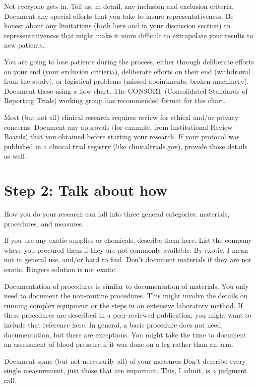 \documentclass[
  letterpaper,
  DIV=11,
  numbers=noendperiod]{scrreprt}
\begin{document}
Not everyone gets in. Tell us, in detail, any inclusion and exclusion
criteria. Document any special efforts that you take to insure
representativeness. Be honest about any limitations (both here and in
your discussion section) to representativeness that might make it more
difficult to extrapolate your results to new patients.

You are going to lose patients during the process, either through
deliberate efforts on your end (your exclusion critieria), deliberate
efforts on their end (withdrawal from the study), or logistical problems
(missed apointments, broken machinery). Document these using a flow
chart. The CONSORT (Consolidated Standards of Reporting Trials) working
group has recommended format for this chart.

Most (but not all) clinical research requires review for ethical and/or
privacy concerns. Document any approvals (for example, from
Institutional Review Boards) that you obtained before starting your
research. If your protocol was published in a clinical trial registry
(like clinicaltrials.gov), provide those details as well.

\section{Step 2: Talk about how}\label{step-2-talk-about-how}

How you do your research can fall into three general categories:
materials, procedures, and measures.

If you use any exotic supplies or chemicals, describe them here. List
the company where you procured them if they are not commonly available.
By exotic, I mean not in general use, and/or hard to find. Don't
document materials if they are not exotic. Ringers solution is not
exotic.

Documentation of procedures is similar to documentation of materials.
You only need to document the non-routine procedures. This might involve
the details on running complex equipment or the steps in an extensive
laboratory method. If these procedures are described in a peer-reviewed
publication, you might want to include that reference here. In general,
a basic procedure does not need documentation, but there are exceptions.
You might take the time to document an assessment of blood pressure if
it was done on a leg rather than an arm.

Document some (but not necessarily all) of your measures Don't describe
every single measurement, just those that are important. This, I admit,
is a judgment call.
\end{document}
